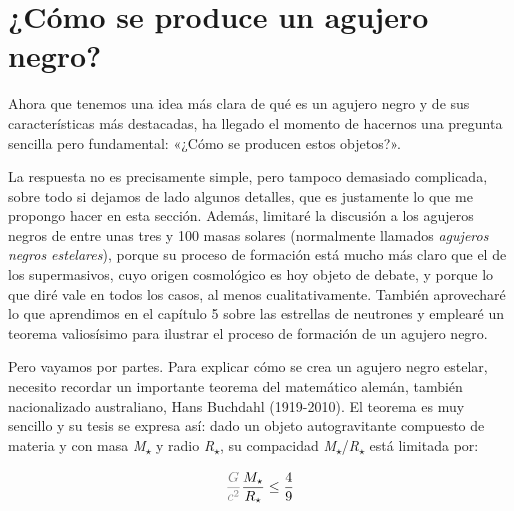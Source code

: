 \section{¿Cómo se produce un agujero negro?}\label{sec:06-formation}

Ahora que tenemos una idea más clara de qué es un agujero negro y de sus características más destacadas, ha llegado el momento de hacernos una pregunta sencilla pero fundamental: «¿Cómo se producen estos objetos?».

La respuesta no es precisamente simple, pero tampoco demasiado complicada, sobre todo si dejamos de lado algunos detalles, que es justamente lo que me propongo hacer en esta sección. Además, limitaré la discusión a los agujeros negros de entre unas tres y 100 masas solares (normalmente llamados \emph{agujeros negros estelares}), porque su proceso de formación está mucho más claro que el de los supermasivos, cuyo origen cosmológico es hoy objeto de debate, y porque lo que diré vale en todos los casos, al menos cualitativamente. También aprovecharé lo que aprendimos en el capítulo 5 sobre las estrellas de neutrones y emplearé un teorema valiosísimo para ilustrar el proceso de formación de un agujero negro.

Pero vayamos por partes. Para explicar cómo se crea un agujero negro estelar, necesito recordar un importante teorema del matemático alemán, también nacionalizado australiano, Hans Buchdahl (1919-2010). El teorema es muy sencillo y su tesis se expresa así: dado un objeto autogravitante compuesto de materia y con masa \emph{M}\textsubscript{\(\star\)} y radio \emph{R}\textsubscript{\(\star\)}, su compacidad \emph{M}\textsubscript{\(\star\)}/\emph{R}\textsubscript{\(\star\)} está limitada por:

\begin{equation}\label{eq:06-03}
\textcolor{gray}{\frac{G}{c^{2}}}\frac{M_{\star}}{R_{\star}}\leq\frac{4}{9}
\end{equation}


